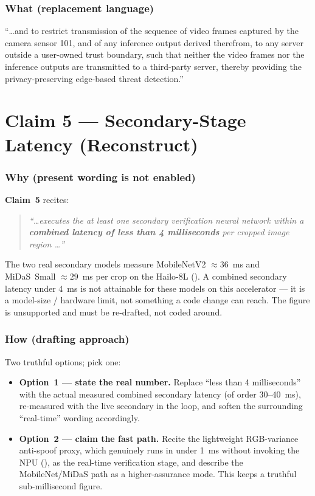 \documentclass[12pt,a4paper]{article}
\newcommand{\clm}[1]{\textbf{Claim~#1}}
\begin{document}
\subsubsection{What (replacement language)}
\begin{whatbox}
``\ldots and to restrict transmission of the sequence of video frames captured by the camera
sensor 101, and of any inference output derived therefrom, to any server outside a
user-owned trust boundary, such that neither the video frames nor the inference outputs are
transmitted to a third-party server, thereby providing the privacy-preserving edge-based
threat detection.''
\end{whatbox}

\section{Claim 5 --- Secondary-Stage Latency (Reconstruct)}\label{sec:c5}

\subsubsection{Why (present wording is not enabled)}
\clm{5} recites:

\begin{quote}\itshape
``\ldots executes the at least one secondary verification neural network within a
\textbf{combined latency of less than 4 milliseconds} per cropped image region \ldots''
\end{quote}

The two real secondary models measure MobileNetV2 $\approx 36$~ms and MiDaS~Small
$\approx 29$~ms per crop on the Hailo-8L (). A combined
secondary latency under 4~ms is not attainable for these models on this accelerator --- it is
a model-size / hardware limit, not something a code change can reach. The figure is
unsupported and must be re-drafted, not coded around.

\subsubsection{How (drafting approach)}
Two truthful options; pick one:
\begin{itemize}[leftmargin=1.4em,itemsep=3pt,topsep=2pt]
  \item \textbf{Option~1 --- state the real number.} Replace ``less than 4 milliseconds''
        with the actual measured combined secondary latency (of order 30--40~ms), re-measured
        with the live secondary in the loop, and soften the surrounding ``real-time'' wording
        accordingly.
  \item \textbf{Option~2 --- claim the fast path.} Recite the lightweight RGB-variance
        anti-spoof proxy, which genuinely runs in under 1~ms without invoking the NPU
        (), as the real-time verification stage, and
        describe the MobileNet/MiDaS path as a higher-assurance mode. This keeps a truthful
        sub-millisecond figure.
\end{itemize}
\end{document}
